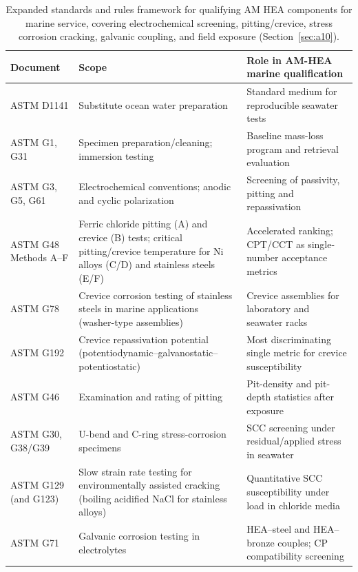\begin{table}[t]
\centering
\caption{Expanded standards and rules framework for qualifying AM HEA components for marine service, covering electrochemical screening, pitting/crevice, stress corrosion cracking, galvanic coupling, and field exposure (Section~\ref{sec:a10}).}
\label{tab:standards}
\footnotesize
\begin{tabularx}{\textwidth}{@{}lXX@{}}
\toprule
Document & Scope & Role in AM-HEA marine qualification \\
\midrule
ASTM D1141 \cite{astm_d1141} & Substitute ocean water preparation & Standard medium for reproducible seawater tests \\
ASTM G1, G31 \cite{astm_g1,astm_g31} & Specimen preparation/cleaning; immersion testing & Baseline mass-loss program and retrieval evaluation \\
ASTM G3, G5, G61 \cite{astm_g3,astm_g5,astm_g61} & Electrochemical conventions; anodic and cyclic polarization & Screening of passivity, pitting and repassivation \\
ASTM G48 Methods A--F \cite{astm_g48} & Ferric chloride pitting (A) and crevice (B) tests; critical pitting/crevice temperature for Ni alloys (C/D) and stainless steels (E/F) & Accelerated ranking; CPT/CCT as single-number acceptance metrics \\
ASTM G78 \cite{astm_g78} & Crevice corrosion testing of stainless steels in marine applications (washer-type assemblies) & Crevice assemblies for laboratory and seawater racks \\
ASTM G192 \cite{astm_g192} & Crevice repassivation potential (potentiodynamic--galvanostatic--potentiostatic) & Most discriminating single metric for crevice susceptibility \\
ASTM G46 \cite{astm_g46} & Examination and rating of pitting & Pit-density and pit-depth statistics after exposure \\
ASTM G30, G38/G39 \cite{astm_g30,astm_g38,astm_g39} & U-bend and C-ring stress-corrosion specimens & SCC screening under residual/applied stress in seawater \\
ASTM G129 (and G123) \cite{astm_g129,astm_g123} & Slow strain rate testing for environmentally assisted cracking (boiling acidified NaCl for stainless alloys) & Quantitative SCC susceptibility under load in chloride media \\
ASTM G71 \cite{astm_g71} & Galvanic corrosion testing in electrolytes & HEA--steel and HEA--bronze couples; CP compatibility screening \\

\end{tabularx}
\end{table}
